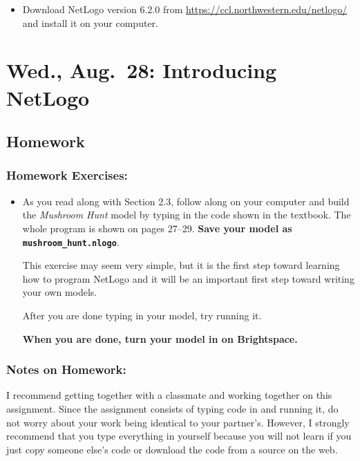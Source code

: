 \documentclass[
]{article}
\providecommand{\tightlist}{%
  \setlength{\itemsep}{0pt}\setlength{\parskip}{0pt}}
\begin{document}
\begin{itemize}
\tightlist
\item
  Download NetLogo version 6.2.0 from
  \url{https://ccl.northwestern.edu/netlogo/} and install it on your
  computer.
\end{itemize}

\section{Wed., Aug.~28: Introducing
NetLogo}\label{wed.-aug.-28-introducing-netlogo}

\subsection{Homework}\label{homework-1}

\subsubsection{Homework Exercises:}\label{homework-exercises-1}

\begin{itemize}
\item
  As you read along with Section 2.3, follow along on your computer and
  build the \emph{Mushroom Hunt} model by typing in the code shown in
  the textbook. The whole program is shown on pages 27--29. \textbf{Save
  your model as \texttt{mushroom\_hunt.nlogo}}.

  This exercise may seem very simple, but it is the first step toward
  learning how to program NetLogo and it will be an important first step
  toward writing your own models.

  After you are done typing in your model, try running it.

  \textbf{When you are done, turn your model in on Brightspace.}
\end{itemize}

\subsubsection{Notes on Homework:}\label{notes-on-homework}

I recommend getting together with a classmate and working together on
this assignment. Since the assignment consists of typing code in and
running it, do not worry about your work being identical to your
partner's. However, I strongly recommend that you type everything in
yourself because you will not learn if you just copy someone else's code
or download the code from a source on the web.
\end{document}
